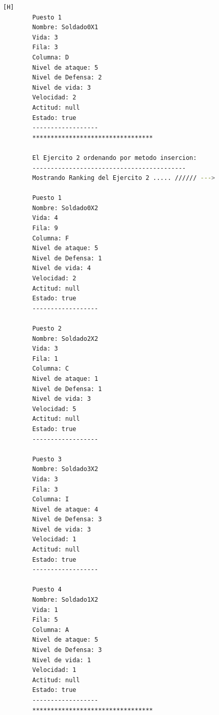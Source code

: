 \documentclass{article}
\begin{document}
\begin{lstlisting}[language=bash,caption={Ejecucion:}][H]
		Puesto 1
		Nombre: Soldado0X1
		Vida: 3
		Fila: 3
		Columna: D
		Nivel de ataque: 5
		Nivel de Defensa: 2
		Nivel de vida: 3
		Velocidad: 2
		Actitud: null
		Estado: true
		------------------
		*********************************
		
		El Ejercito 2 ordenando por metodo insercion: 
		------------------------------------------
		Mostrando Ranking del Ejercito 2 ..... ////// --->
		
		Puesto 1
		Nombre: Soldado0X2
		Vida: 4
		Fila: 9
		Columna: F
		Nivel de ataque: 5
		Nivel de Defensa: 1
		Nivel de vida: 4
		Velocidad: 2
		Actitud: null
		Estado: true
		------------------
		
		Puesto 2
		Nombre: Soldado2X2
		Vida: 3
		Fila: 1
		Columna: C
		Nivel de ataque: 1
		Nivel de Defensa: 1
		Nivel de vida: 3
		Velocidad: 5
		Actitud: null
		Estado: true
		------------------
		
		Puesto 3
		Nombre: Soldado3X2
		Vida: 3
		Fila: 3
		Columna: I
		Nivel de ataque: 4
		Nivel de Defensa: 3
		Nivel de vida: 3
		Velocidad: 1
		Actitud: null
		Estado: true
		------------------
		
		Puesto 4
		Nombre: Soldado1X2
		Vida: 1
		Fila: 5
		Columna: A
		Nivel de ataque: 5
		Nivel de Defensa: 3
		Nivel de vida: 1
		Velocidad: 1
		Actitud: null
		Estado: true
		------------------
		*********************************
		
	\end{lstlisting}
\end{document}
